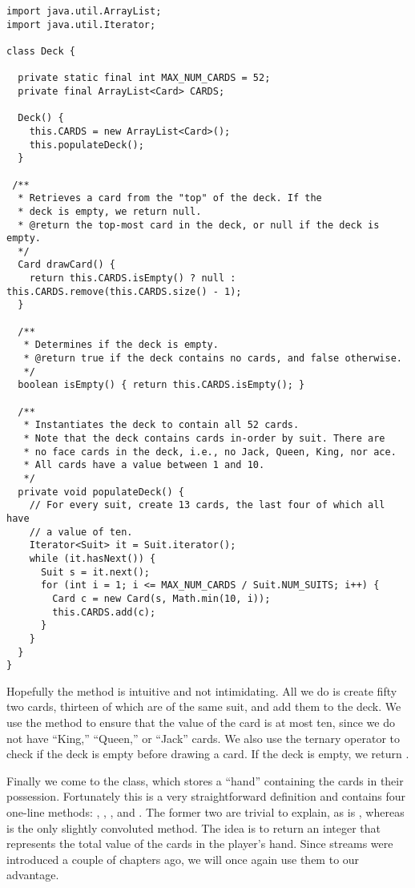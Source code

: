 \begin{lstlisting}[language=MyJava]
import java.util.ArrayList;
import java.util.Iterator;

class Deck {

  private static final int MAX_NUM_CARDS = 52;
  private final ArrayList<Card> CARDS;

  Deck() {
    this.CARDS = new ArrayList<Card>();
    this.populateDeck();
  }

 /**
  * Retrieves a card from the "top" of the deck. If the
  * deck is empty, we return null.
  * @return the top-most card in the deck, or null if the deck is empty.
  */
  Card drawCard() {
    return this.CARDS.isEmpty() ? null : this.CARDS.remove(this.CARDS.size() - 1);
  }

  /**
   * Determines if the deck is empty.
   * @return true if the deck contains no cards, and false otherwise.
   */
  boolean isEmpty() { return this.CARDS.isEmpty(); }

  /**
   * Instantiates the deck to contain all 52 cards.
   * Note that the deck contains cards in-order by suit. There are 
   * no face cards in the deck, i.e., no Jack, Queen, King, nor ace.
   * All cards have a value between 1 and 10.
   */
  private void populateDeck() {
    // For every suit, create 13 cards, the last four of which all have
    // a value of ten.
    Iterator<Suit> it = Suit.iterator();
    while (it.hasNext()) {
      Suit s = it.next();
      for (int i = 1; i <= MAX_NUM_CARDS / Suit.NUM_SUITS; i++) {
        Card c = new Card(s, Math.min(10, i));
        this.CARDS.add(c);
      }
    }
  }
}
\end{lstlisting}

Hopefully the  method is intuitive and not intimidating. All we do is create fifty two cards, thirteen of which are of the same suit, and add them to the deck. We use the  method to ensure that the value of the card is at most ten, since we do not have ``King,'' ``Queen,'' or ``Jack'' cards. We also use the ternary operator to check if the deck is empty before drawing a card. If the deck is empty, we return .

Finally we come to the  class, which stores a ``hand'' containing the cards in their possession. Fortunately this is a very straightforward definition and contains four one-line methods: , , , and . The former two are trivial to explain, as is , whereas  is the only slightly convoluted method. The idea is to return an integer that represents the total value of the cards in the player's hand. Since streams were introduced a couple of chapters ago, we will once again use them to our advantage.

